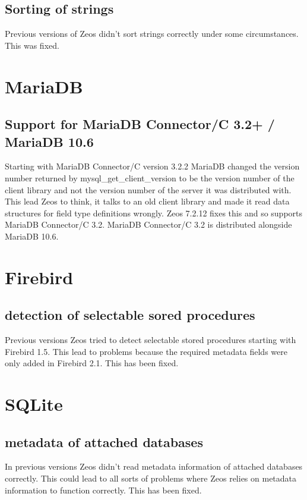 \documentclass[a4paper,12pt,oneside]{book}
\begin{document}
\subsection{Sorting of strings}
Previous versions of Zeos didn't sort strings correctly under some circumstances.
This was fixed.

\section{MariaDB}

\subsection{Support for MariaDB Connector/C 3.2+ / MariaDB 10.6}
Starting with MariaDB Connector/C version 3.2.2 MariaDB changed the version number returned by mysql\_get\_client\_version to be the version number of the client library and not the version number of the server it was distributed with.
This lead Zeos to think, it talks to an old client library and made it read data structures for field type definitions wrongly.
Zeos 7.2.12 fixes this and so supports MariaDB Connector/C 3.2.
MariaDB Connector/C 3.2 is distributed alongside MariaDB 10.6.

\section{Firebird}

\subsection{detection of selectable sored procedures}
Previous versions Zeos tried to detect selectable stored procedures starting with Firebird 1.5.
This lead to problems because the required metadata fields were only added in Firebird 2.1.
This has been fixed.

\section{SQLite}
\subsection{metadata of attached databases}
In previous versions Zeos didn't read metadata information of attached databases correctly.
This could lead to all sorts of problems where Zeos relies on metadata information to function correctly.
This has been fixed.
\end{document}

